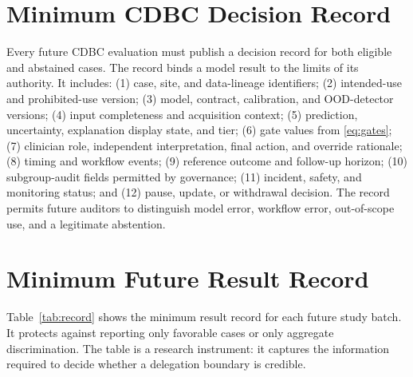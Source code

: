 \documentclass[conference]{IEEEtran}
\begin{document}
\appendices
\section{Minimum CDBC Decision Record}

Every future CDBC evaluation must publish a decision record for both eligible and abstained cases. The record binds a model result to the limits of its authority. It includes: (1) case, site, and data-lineage identifiers; (2) intended-use and prohibited-use version; (3) model, contract, calibration, and OOD-detector versions; (4) input completeness and acquisition context; (5) prediction, uncertainty, explanation display state, and tier; (6) gate values from \eqref{eq:gates}; (7) clinician role, independent interpretation, final action, and override rationale; (8) timing and workflow events; (9) reference outcome and follow-up horizon; (10) subgroup-audit fields permitted by governance; (11) incident, safety, and monitoring status; and (12) pause, update, or withdrawal decision. The record permits future auditors to distinguish model error, workflow error, out-of-scope use, and a legitimate abstention.

\section{Minimum Future Result Record}

Table~\ref{tab:record} shows the minimum result record for each future study batch. It protects against reporting only favorable cases or only aggregate discrimination. The table is a research instrument: it captures the information required to decide whether a delegation boundary is credible.
\end{document}
